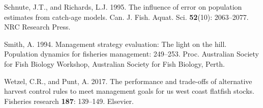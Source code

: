 \documentclass[12pt,]{article}
\begin{document}
\hypertarget{ref-schnute1995influence}{}
Schnute, J.T., and Richards, L.J. 1995. The influence of error on
population estimates from catch-age models. Can. J. Fish. Aquat. Sci.
\textbf{52}(10): 2063--2077. NRC Research Press.

\hypertarget{ref-smith1994management}{}
Smith, A. 1994. Management strategy evaluation: The light on the hill.
Population dynamics for fisheries management: 249--253. Proc. Australian
Society for Fish Biology Workshop, Australian Society for Fish Biology,
Perth.

\hypertarget{ref-wetzel2017performance}{}
Wetzel, C.R., and Punt, A. 2017. The performance and trade-offs of
alternative harvest control rules to meet management goals for us west
coast flatfish stocks. Fisheries research \textbf{187}: 139--149.
Elsevier.
\end{document}
